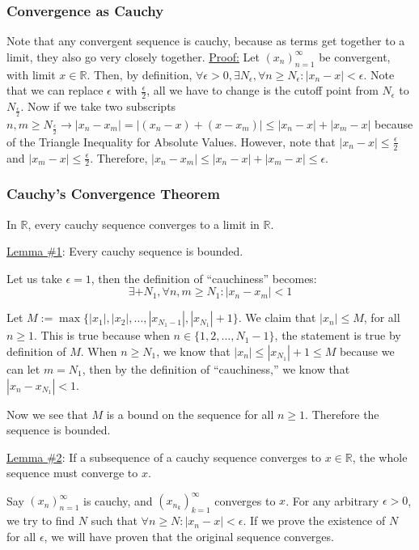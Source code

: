 \documentclass[11 pt, twoside]{article}
\begin{document}
\subsubsection{Convergence as Cauchy}
Note that any convergent sequence is cauchy, because as terms get together
to a limit, they also go very closely together.
\underline{Proof:} Let $(x_n)_{n = 1}^\infty$ be convergent, with limit $x \in \mathbb{R}$.
Then, by definition, $\forall \epsilon > 0, \exists N_\epsilon, \forall
n \geq N_\epsilon :
|x_n - x| < \epsilon$. Note that we can replace $\epsilon$ with
$\frac{\epsilon}{2}$, all we have to change is the cutoff point from
$N_{\epsilon}$ to $N_{\frac{\epsilon}{2}}$. Now if we take two subscripts
$n, m \geq N_{\frac{\epsilon}{2}} \longrightarrow |x_n - x_m| = |(x_n - x) + (x - x_m)| \leq |x_n - x| + |x_m - x|$ because of the Triangle Inequality for Absolute Values. However, note that $|x_n - x| \leq \frac{\epsilon}{2}$ and $|x_m - x| \leq \frac{\epsilon}{2}$.
Therefore, $|x_n - x_m| \leq |x_n - x| + |x_m - x| \leq \epsilon$.

\subsubsection{Cauchy's Convergence Theorem}

In $\mathbb{R}$, every cauchy sequence converges to a limit in $\mathbb{R}$.
\par \underline{Lemma \#1}: Every cauchy sequence is bounded.

Let us take $\epsilon = 1$, then the definition of ``cauchiness'' becomes:
$$\exists+ N_1, \forall n, m \geq N_1 : |x_n - x_m| < 1$$

Let $M := \max\{|x_1|, |x_2|, \dots, |x_{N_1 - 1}|, |x_{N_1}| + 1\}$. We claim
that $|x_n| \leq M$, for all $n \geq 1$. This is true because when $n \in \{1, 2, \dots, N_1
- 1\}$, the statement is true by definition of $M$. When $n \geq N_1$, we know
that $|x_n| \leq |x_{N_1}| + 1 \leq M$ because we can let $m = N_1$, then by the
definition of ``cauchiness,'' we know that $|x_n - x_{N_1}| < 1$.

Now we see that $M$ is a bound on the sequence for all $n \geq 1$. Therefore the
sequence is bounded.

\underline{Lemma \#2}: If a subsequence of a cauchy sequence converges to $x \in \mathbb{R}$, the
whole sequence must converge to $x$.

Say $(x_n)_{n=1}^\infty$ is cauchy, and $(x_{n_k})_{k = 1}^\infty$ converges to
$x$. For any arbitrary $\epsilon > 0$, we try to find $N$ such that $\forall
n \geq N: |x_n - x| < \epsilon$. If we prove the existence of $N$ for all
$\epsilon$, we will have proven that the original sequence converges.
\end{document}
